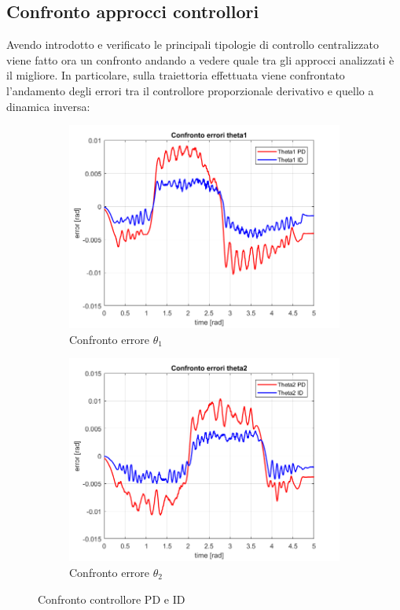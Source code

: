 \subsection{Confronto approcci controllori}
Avendo introdotto e verificato le principali tipologie di controllo centralizzato viene fatto ora un confronto andando a vedere quale tra gli approcci analizzati è il migliore. In particolare, sulla traiettoria effettuata viene confrontato l'andamento degli errori tra il controllore proporzionale derivativo e quello a dinamica inversa:
\begin{figure}[!ht]
\begin{subfigure}{.53\textwidth}
  \centering
  \includegraphics[width=.9\linewidth]{Immagini/Traiettorie/ConfontoErroriTheta1}  
  \caption{Confronto errore $\theta_1$ }
  \label{fig:sub-tid1}
\end{subfigure}
\begin{subfigure}{.53\textwidth}
  \centering
  \includegraphics[width=.9\linewidth]{Immagini/Traiettorie/ConfontoErroriTheta2}  
  \caption{Confronto errore $\theta_2$}
  \label{fig:sub-tid2}
\end{subfigure}
\caption{Confronto controllore PD e ID}
\end{figure}
